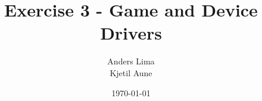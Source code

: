 \newcommand{\mytitle}{Exercise 3 - Game and Device Drivers}
\newcommand{\mygroupnumber}{29}
\newcommand{\myauthor}{Anders Lima\\Kjetil Aune\\}

\title{\mytitle}
\author{\myauthor}
\date{\today}
